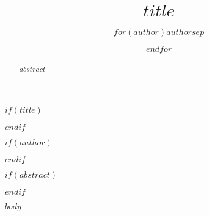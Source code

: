 \documentclass{article}
\begin{document}
$if(title)$
\title{$title$}
$endif$

$if(author)$
\author{$for(author)$$author$$sep$ \and $endfor$}
$endif$

\maketitle

$if(abstract)$
\begin{abstract}
$abstract$
\end{abstract}
$endif$

$body$
\end{document}
